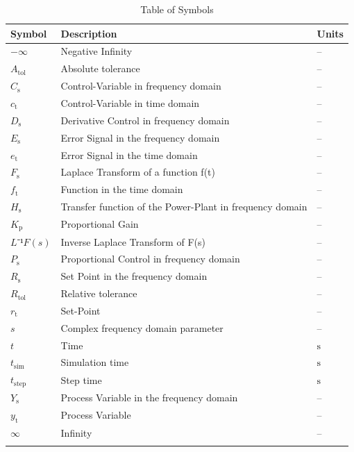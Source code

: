 \documentclass[12pt]{article}
\begin{document}
\begin{longtabu}{l X[l] l}
\toprule
\textbf{Symbol} & \textbf{Description} & \textbf{Units}
\\
\midrule
\endhead
$-∞$ & Negative Infinity & --
\\
${A_{\text{tol}}}$ & Absolute tolerance & --
\\
${C_{\text{s}}}$ & Control-Variable in frequency domain & --
\\
${c_{\text{t}}}$ & Control-Variable in time domain & --
\\
${D_{\text{s}}}$ & Derivative Control in frequency domain & --
\\
${E_{\text{s}}}$ & Error Signal in the frequency domain & --
\\
${e_{\text{t}}}$ & Error Signal in the time domain & --
\\
${F_{\text{s}}}$ & Laplace Transform of a function f(t) & --
\\
${f_{\text{t}}}$ & Function in the time domain & --
\\
${H_{\text{s}}}$ & Transfer function of the Power-Plant in frequency domain & --
\\
${K_{\text{p}}}$ & Proportional Gain & --
\\
$L⁻¹{F(s)}$ & Inverse Laplace Transform of F(s) & --
\\
${P_{\text{s}}}$ & Proportional Control in frequency domain & --
\\
${R_{\text{s}}}$ & Set Point in the frequency domain & --
\\
${R_{\text{tol}}}$ & Relative tolerance & --
\\
${r_{\text{t}}}$ & Set-Point & --
\\
$s$ & Complex frequency domain parameter & --
\\
$t$ & Time & ${\text{s}}$
\\
${t_{\text{sim}}}$ & Simulation time & ${\text{s}}$
\\
${t_{\text{step}}}$ & Step time & ${\text{s}}$
\\
${Y_{\text{s}}}$ & Process Variable in the frequency domain & --
\\
${y_{\text{t}}}$ & Process Variable & --
\\
$∞$ & Infinity & --
\\
\bottomrule
\caption{Table of Symbols}
\label{Table:ToS}
\end{longtabu}
\end{document}
